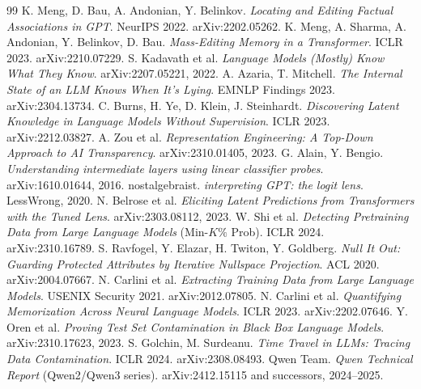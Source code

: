\documentclass[11pt]{article}
\begin{document}
\begin{thebibliography}{99}\small
{} K. Meng, D. Bau, A. Andonian, Y. Belinkov. \emph{Locating and Editing Factual Associations in GPT}. NeurIPS 2022. arXiv:2202.05262.
 K. Meng, A. Sharma, A. Andonian, Y. Belinkov, D. Bau. \emph{Mass-Editing Memory in a Transformer}. ICLR 2023. arXiv:2210.07229.
 S. Kadavath et al. \emph{Language Models (Mostly) Know What They Know}. arXiv:2207.05221, 2022.
 A. Azaria, T. Mitchell. \emph{The Internal State of an LLM Knows When It's Lying}. EMNLP Findings 2023. arXiv:2304.13734.
 C. Burns, H. Ye, D. Klein, J. Steinhardt. \emph{Discovering Latent Knowledge in Language Models Without Supervision}. ICLR 2023. arXiv:2212.03827.
 A. Zou et al. \emph{Representation Engineering: A Top-Down Approach to AI Transparency}. arXiv:2310.01405, 2023.
 G. Alain, Y. Bengio. \emph{Understanding intermediate layers using linear classifier probes}. arXiv:1610.01644, 2016.
 nostalgebraist. \emph{interpreting GPT: the logit lens}. LessWrong, 2020.
 N. Belrose et al. \emph{Eliciting Latent Predictions from Transformers with the Tuned Lens}. arXiv:2303.08112, 2023.
 W. Shi et al. \emph{Detecting Pretraining Data from Large Language Models} (Min-$K\%$ Prob). ICLR 2024. arXiv:2310.16789.
 S. Ravfogel, Y. Elazar, H. Twiton, Y. Goldberg. \emph{Null It Out: Guarding Protected Attributes by Iterative Nullspace Projection}. ACL 2020. arXiv:2004.07667.
 N. Carlini et al. \emph{Extracting Training Data from Large Language Models}. USENIX Security 2021. arXiv:2012.07805.
 N. Carlini et al. \emph{Quantifying Memorization Across Neural Language Models}. ICLR 2023. arXiv:2202.07646.
 Y. Oren et al. \emph{Proving Test Set Contamination in Black Box Language Models}. arXiv:2310.17623, 2023.
 S. Golchin, M. Surdeanu. \emph{Time Travel in LLMs: Tracing Data Contamination}. ICLR 2024. arXiv:2308.08493.
 Qwen Team. \emph{Qwen Technical Report} (Qwen2/Qwen3 series). arXiv:2412.15115 and successors, 2024--2025.
\end{thebibliography}
\end{document}
